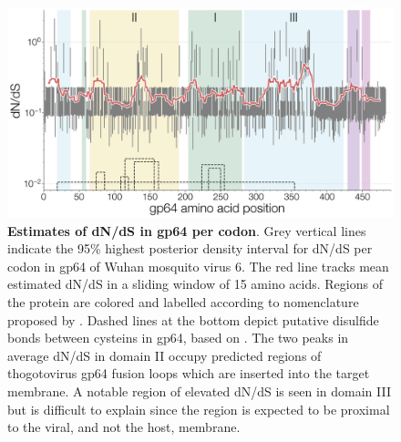 \documentclass[11pt,twocolumn]{article}
\begin{document}
\begin{figure}
\centering
\includegraphics[width=\textwidth]{SuppFig5_sitewiseDNDS.png}
\caption{
\textbf{Estimates of dN/dS in gp64 per codon}.
Grey vertical lines indicate the 95\% highest posterior density interval for dN/dS per codon in gp64 of Wuhan mosquito virus 6.
The red line tracks mean estimated dN/dS in a sliding window of 15 amino acids.
Regions of the protein are colored and labelled according to nomenclature proposed by \cite{garry_proteomics_2008}.
Dashed lines at the bottom depict putative disulfide bonds between cysteins in gp64, based on \cite{garry_proteomics_2008}.
The two peaks in average dN/dS in domain II occupy predicted regions of thogotovirus gp64 fusion loops which are inserted into the target membrane.
A notable region of elevated dN/dS is seen in domain III but is difficult to explain since the region is expected to be proximal to the viral, and not the host, membrane.
}
\end{figure}
\end{document}
